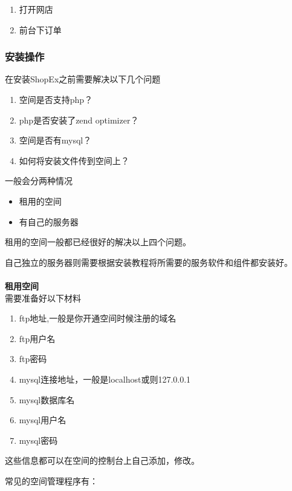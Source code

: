 \documentclass{article}
\begin{document}
\begin{enumerate}
\item 打开网店
\item 前台下订单
\end{enumerate}

\hypertarget{toc20}{}
\subsubsection{安装操作}
在安装ShopEx之前需要解决以下几个问题

\begin{enumerate}
\item 空间是否支持php？
\item php是否安装了zend optimizer？
\item 空间是否有mysql？
\item 如何将安装文件传到空间上？
\end{enumerate}

一般会分两种情况

\begin{itemize}
\item 租用的空间
\item 有自己的服务器
\end{itemize}

租用的空间一般都已经很好的解决以上四个问题。

自己独立的服务器则需要根据安装教程将所需要的服务软件和组件都安装好。

\paragraph{}\textbf{租用空间}\\

需要准备好以下材料

\begin{enumerate}
\item ftp地址,一般是你开通空间时候注册的域名
\item ftp用户名
\item ftp密码
\item mysql连接地址，一般是localhost或则127.0.0.1
\item mysql数据库名
\item mysql用户名
\item mysql密码
\end{enumerate}

这些信息都可以在空间的控制台上自己添加，修改。

常见的空间管理程序有：
\end{document}
